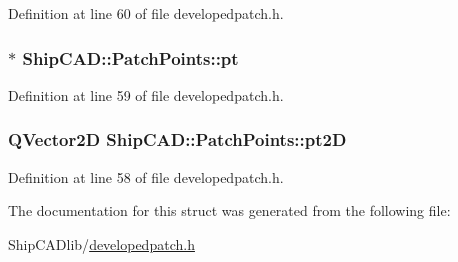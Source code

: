 Definition at line 60 of file developedpatch.\+h.

\subsubsection[{\texorpdfstring{pt}{pt}}]{$\ast$ Ship\+C\+A\+D\+::\+Patch\+Points\+::pt}\hypertarget{structShipCAD_1_1PatchPoints_ac69ca0b5e51939979f4654afa3b210a9}{}\label{structShipCAD_1_1PatchPoints_ac69ca0b5e51939979f4654afa3b210a9}


Definition at line 59 of file developedpatch.\+h.

\subsubsection[{\texorpdfstring{pt2D}{pt2D}}]{\setlength{\rightskip}{0pt plus 5cm}Q\+Vector2D Ship\+C\+A\+D\+::\+Patch\+Points\+::pt2D}\hypertarget{structShipCAD_1_1PatchPoints_abce4e4187927ae79ecd5aafd604c1785}{}\label{structShipCAD_1_1PatchPoints_abce4e4187927ae79ecd5aafd604c1785}


Definition at line 58 of file developedpatch.\+h.



The documentation for this struct was generated from the following file\+:\begin{DoxyCompactItemize}
\item 
Ship\+C\+A\+Dlib/\hyperlink{developedpatch_8h}{developedpatch.\+h}\end{DoxyCompactItemize}
